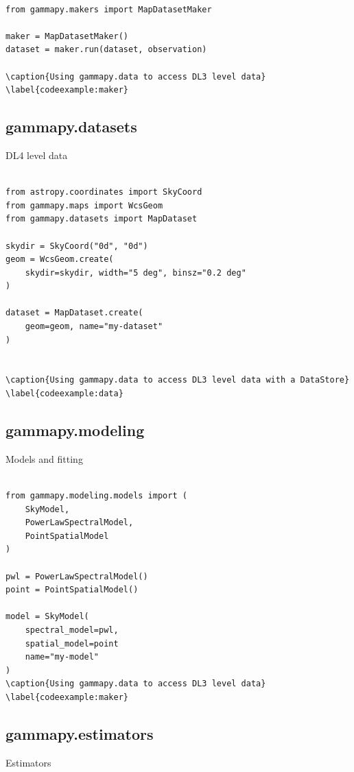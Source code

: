 \begin{lstlisting}

from gammapy.makers import MapDatasetMaker

maker = MapDatasetMaker()
dataset = maker.run(dataset, observation)

\caption{Using gammapy.data to access DL3 level data}
\label{codeexample:maker}
\end{lstlisting}


\subsection{gammapy.datasets}
DL4 level data


\begin{lstlisting}

from astropy.coordinates import SkyCoord
from gammapy.maps import WcsGeom
from gammapy.datasets import MapDataset

skydir = SkyCoord("0d", "0d")
geom = WcsGeom.create(
	skydir=skydir, width="5 deg", binsz="0.2 deg"
)

dataset = MapDataset.create(
	geom=geom, name="my-dataset"
)


\caption{Using gammapy.data to access DL3 level data with a DataStore}
\label{codeexample:data}
\end{lstlisting}



\subsection{gammapy.modeling}
Models and fitting

\begin{lstlisting}

from gammapy.modeling.models import (
	SkyModel,
	PowerLawSpectralModel,
	PointSpatialModel
)

pwl = PowerLawSpectralModel()
point = PointSpatialModel()

model = SkyModel(
	spectral_model=pwl,
	spatial_model=point
	name="my-model"
)
\caption{Using gammapy.data to access DL3 level data}
\label{codeexample:maker}
\end{lstlisting}


\subsection{gammapy.estimators}
Estimators

